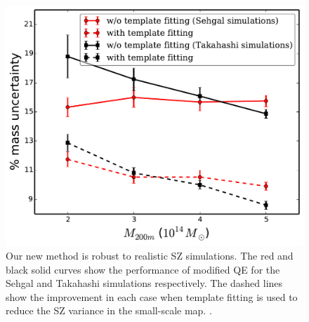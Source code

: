 {\begin{figure}[htb]
\includegraphics[width=\linewidth]{figs/Daisuke_Sehgal_results.pdf}
 \caption{
Our new method is robust to realistic SZ simulations. 
The red and black solid curves show the performance of modified QE for the Sehgal and Takahashi simulations respectively. 
The dashed lines show the improvement in each case when template fitting is used to reduce the SZ variance in the small-scale map. 
 .
 }
\label{fig:realistic_sims}
\end{figure}

}
